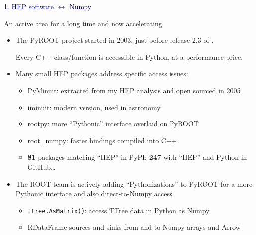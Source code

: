 \documentclass[aspectratio=169]{beamer}
\begin{document}
\begin{frame}{}
\LARGE
\vspace{1 cm}
\begin{center}
\textcolor{darkblue}{1. HEP software $\leftrightarrow$ Numpy}
\end{center}
\end{frame}

\begin{frame}{An active area for a long time and now accelerating}
\vspace{0.5 cm}
\begin{itemize}\setlength{\itemsep}{0.5 cm}
\item The PyROOT project started in 2003, just before release 2.3 of .

Every C++ class/function is accessible in Python, at a performance price.

\item Many small HEP packages address specific access issues:

\vspace{0.05 cm}
\begin{itemize}\setlength{\itemsep}{0.05 cm}
\item PyMinuit: extracted from my HEP analysis and open sourced in 2005
\item iminuit: modern version, used in astronomy
\item rootpy: more ``Pythonic'' interface overlaid on PyROOT
\item root\_numpy: faster bindings compiled into C++
\item {\bf 81} packages matching ``HEP'' in PyPI; {\bf 247} with ``HEP'' and Python in GitHub\ldots
\end{itemize}

\item The ROOT team is actively adding ``Pythonizations'' to PyROOT for a more Pythonic interface and also direct-to-Numpy access.

\vspace{0.1 cm}
\begin{itemize}\setlength{\itemsep}{0.1 cm}
\item {\tt\small ttree.AsMatrix()}: access TTree data in Python as Numpy
\item RDataFrame sources and sinks from and to Numpy arrays and Arrow
\end{itemize}
\end{itemize}
\end{frame}
\end{document}
